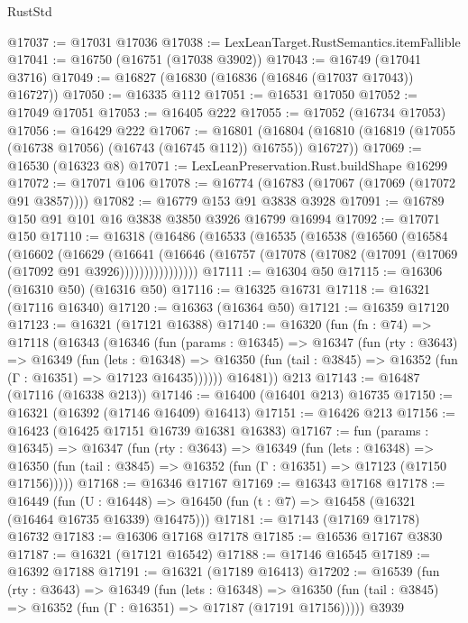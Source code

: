 \begin{lexlean}{RustStd}
\begin{coremodule}
@17037 := @17031 @17036
@17038 := LexLeanTarget.RustSemantics.itemFallible
@17041 := @16750 (@16751 (@17038 @3902))
@17043 := @16749 (@17041 @3716)
@17049 := @16827 (@16830 (@16836 (@16846 (@17037 @17043)) @16727))
@17050 := @16335 @112
@17051 := @16531 @17050
@17052 := @17049 @17051
@17053 := @16405 @222
@17055 := @17052 (@16734 @17053)
@17056 := @16429 @222
@17067 := @16801
    (@16804 (@16810 (@16819 (@17055 (@16738 @17056) (@16743 (@16745 @112)) @16755)) @16727))
@17069 := @16530 (@16323 @8)
@17071 := LexLeanPreservation.Rust.buildShape @16299
@17072 := @17071 @106
@17078 := @16774 (@16783 (@17067 (@17069 (@17072 @91 @3857))))
@17082 := @16779 @153 @91 @3838 @3928
@17091 := @16789 @150 @91 @101 @16 @3838 @3850 @3926 @16799 @16994
@17092 := @17071 @150
@17110 := @16318
    (@16486
      (@16533
        (@16535
          (@16538
            (@16560
              (@16584
                (@16602
                  (@16629
                    (@16641
                      (@16646
                        (@16757 (@17078 (@17082 (@17091 (@17069 (@17092 @91 @3926))))))))))))))))
@17111 := @16304 @50
@17115 := @16306 (@16310 @50) (@16316 @50)
@17116 := @16325 @16731
@17118 := @16321 (@17116 @16340)
@17120 := @16363 (@16364 @50)
@17121 := @16359 @17120
@17123 := @16321 (@17121 @16388)
@17140 := @16320
    (fun (fn : @74) =>
    @17118
      (@16343
        (@16346
          (fun (params : @16345) =>
          @16347
            (fun (rty : @3643) =>
            @16349
              (fun (lets : @16348) =>
              @16350 (fun (tail : @3845) => @16352 (fun (Γ : @16351) => @17123 @16435))))))
        @16481))
    @213
@17143 := @16487 (@17116 (@16338 @213))
@17146 := @16400 (@16401 @213) @16735
@17150 := @16321 (@16392 (@17146 @16409) @16413)
@17151 := @16426 @213
@17156 := @16423 (@16425 @17151 @16739 @16381 @16383)
@17167 := fun (params : @16345) =>
  @16347
    (fun (rty : @3643) =>
    @16349
      (fun (lets : @16348) =>
      @16350 (fun (tail : @3845) => @16352 (fun (Γ : @16351) => @17123 (@17150 @17156)))))
@17168 := @16346 @17167
@17169 := @16343 @17168
@17178 := @16449
    (fun (U : @16448) => @16450 (fun (t : @7) => @16458 (@16321 (@16464 @16735 @16339) @16475)))
@17181 := @17143 (@17169 @17178) @16732
@17183 := @16306 @17168 @17178
@17185 := @16536 @17167 @3830
@17187 := @16321 (@17121 @16542)
@17188 := @17146 @16545
@17189 := @16392 @17188
@17191 := @16321 (@17189 @16413)
@17202 := @16539
    (fun (rty : @3643) =>
    @16349
      (fun (lets : @16348) =>
      @16350 (fun (tail : @3845) => @16352 (fun (Γ : @16351) => @17187 (@17191 @17156)))))
    @3939

\end{coremodule}
\end{lexlean}
